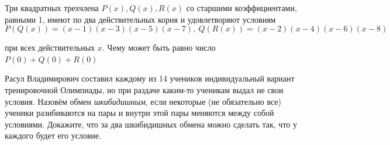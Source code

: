 Три квадратных трехчлена $P(x), Q(x), R(x)$ со старшими коэффициентами, равными 1, имеют по два действительных корня и удовлетворяют условиям 
\[P(Q(x)) = (x-1)(x-3)(x-5)(x-7), \ Q(R(x)) = (x-2)(x-4)(x-6)(x-8) \]

при всех действительных $x$. Чему может быть равно число $P(0)+Q(0)+R(0) $


Расул Владимирович составил каждому из 14 учеников индивидуальный вариант тренировочной Олимпиады, но при раздаче каким-то ученикам выдал не свои условия. Назовём обмен \textit{шкибидишным}, если некоторые (не обязательно все) ученики разибиваются на пары и внутри этой пары меняются между собой условиями. Докажите, что за два шкибидишных обмена можно сделать так, что у каждого будет его условие.